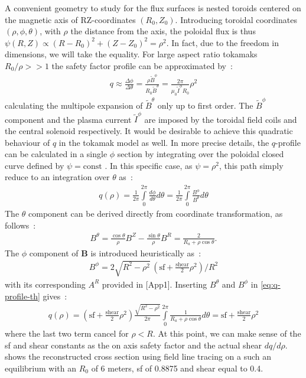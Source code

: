 A convenient geometry to study for the flux surfaces is nested toroids centered on the magnetic axis of RZ-coordinates $(R_0, Z_0)$. Introducing toroidal coordinates $(\rho, \phi, \theta)$, with $\rho$ the distance from the axis, the poloidal flux is thus $\psi(R, Z) \propto (R - R_0)^2 + (Z - Z_0)^2 = \rho^2$. In fact, due to the freedom in dimensions, we will take the equality. For large aspect ratio tokamaks $R_0/\rho >> 1$ the safety factor profile can be approximated by~:
\begin{align*}
    q \approx \frac{\Delta\phi}{\Delta\theta} = \frac{\rho \tilde{B}^\phi}{R_0 \tilde{B}^\theta} = \frac{2\pi}{\mu_0\tilde{I}^\phi R_0} \rho^2
\end{align*}
calculating the multipole expansion of $\tilde{B}^\theta$ only up to first order. The $\tilde{B}^\phi$ component and the plasma current $\tilde{I}^\phi$ are imposed by the toroidal field coils and the central solenoid respectively. It would be desirable to achieve this quadratic behaviour of $q$ in the tokamak model as well. In more precise details, the $q$-profile can be calculated in a single $\phi$ section by integrating over the poloidal closed curve defined by $\psi = \text{const}$ \cite[pp.111-112]{wesson_tokamaks_2011}. In this specific case, as $\psi = \rho^2$, this path simply reduce to an integration over $\theta$ as~:
\begin{align}\label{eq:q-profile-th}
    q(\rho) = \frac{1}{2\pi}\int\limits_0^{2\pi} \frac{d\phi}{d\theta}d\theta = \frac{1}{2\pi}\int\limits_0^{2\pi} \frac{B^\phi}{B^\theta}d\theta
\end{align}
The $\theta$ component can be derived directly from coordinate transformation, as follows~:
\begin{align*}
    B^\theta = \frac{\cos{\theta}}{\rho}B^Z - \frac{\sin{\theta}}{\rho}B^R = \frac{2}{R_a+\rho\cos{\theta}}.
\end{align*}
The $\phi$ component of $\textbf{B}$ is introduced heuristically as~:
\begin{align*}
    B^\phi = 2\sqrt{R^2-\rho^2}\,(\text{sf}+\frac{\text{shear}}{2}\rho^2)/R^2
\end{align*}
with its corresponding $A^R$ provided in [App1]. Inserting $B^\theta$ and $B^\phi$ in \eqref{eq:q-profile-th} gives~:
\begin{align*}
     q(\rho) = (\text{sf}+\frac{\text{shear}}{2}\rho^2)\frac{\sqrt{R^2-\rho^2}}{2\pi}\int\limits_{0}^{2\pi}\frac{1}{R_a + \rho\cos{\theta}}d\theta = \text{sf}+\frac{\text{shear}}{2}\rho^2
\end{align*}
where the last two term cancel for $\rho < R$. At this point, we can make sense of the sf and shear constants as the on axis safety factor and the actual shear $dq/d\rho$.  shows the reconstructed cross section using field line tracing on a such an equilibrium with an $R_0$ of 6 meters, sf of 0.8875 and shear equal to 0.4.

